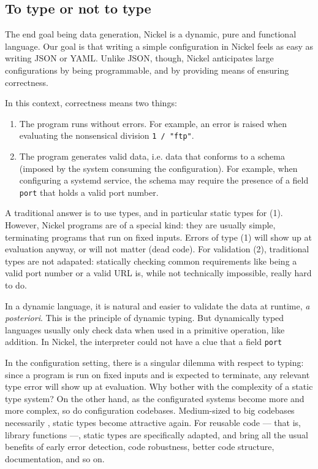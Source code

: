 \documentclass[sigplan,10pt,review,anonymous]{acmart}
\newcommand{\nickel}[1]{\lstinline[language=nickel]{#1}}
\begin{document}
\subsection*{To type or not to type}

The end goal being data generation, Nickel is a dynamic, pure and functional
language. Our goal is that writing a simple configuration in Nickel feels as
easy as writing JSON or YAML. Unlike JSON, though, Nickel anticipates large
configurations by being programmable, and by providing means of ensuring
correctness.

In this context, correctness means two things:
\begin{enumerate}
    \item The program runs without errors. For example, an error is raised when
        evaluating the nonsensical division \nickel{1 / "ftp"}.
    \item The program generates valid data, i.e. data that conforms to a schema
        (imposed by the system consuming the configuration). For example, when
        configuring a systemd service, the schema may require the presence of a
        field \lstinline+port+ that holds a valid port number.
\end{enumerate}

A traditional answer is to use types, and in particular static types for (1).
However, Nickel programs are of a special kind: they are usually simple,
terminating programs that run on fixed inputs. Errors of type (1) will show up
at evaluation anyway, or will not matter (dead code). For validation (2),
traditional types are not adapated: statically checking common requirements
like being a valid port number or a valid URL is, while not technically
impossible, really hard to do.

In a dynamic language, it is natural and easier to validate the data at runtime,
\textit{a posteriori}. This is the principle of dynamic typing. But dynamically
typed languages usually only check data when used in a primitive operation, like
addition. In Nickel, the interpreter could not have a clue that a field
\nickel{port}

In the configuration setting, there is a
singular dilemma with respect to typing: since a program is run on fixed inputs
and is expected to terminate, any relevant type error will show up at
evaluation.  Why bother with the complexity of a static type system? On the
other hand, as the configurated systems become more and more complex, so do
configuration codebases. Medium-sized to big codebases necessarily , static
types become attractive again.  For reusable code — that is, library functions
—, static types are specifically adapted, and bring all the usual benefits of
early error detection, code robustness, better code structure, documentation,
and so on.
\end{document}
